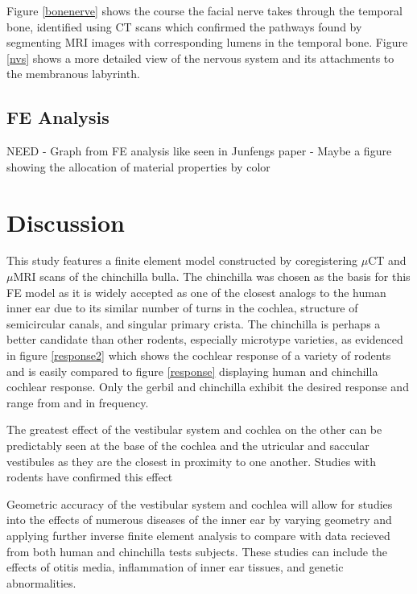 \documentclass[12pt]{article}
\begin{document}
Figure \ref{bonenerve} shows the course the facial nerve takes through the temporal bone, identified using CT scans which confirmed the pathways found by segmenting MRI images with corresponding lumens in the temporal bone. Figure \ref{nvs} shows a more detailed view of the nervous system and its attachments to the membranous labyrinth.


\subsection{FE Analysis}
NEED \newline - Graph from FE analysis like seen in Junfengs paper
- Maybe a figure showing the allocation of material properties by color



\section{Discussion}\label{discussion}
This study features a finite element model constructed by coregistering $\mu$CT and $\mu$MRI scans of the chinchilla bulla. The chinchilla was chosen as the basis for this FE model as it is widely accepted as one of the closest analogs to the human inner ear due to its similar number of turns in the cochlea, structure of semicircular canals, and singular primary crista. \cite{trevino:chinchmodel} The chinchilla is perhaps a better candidate than other rodents, especially microtype varieties, as evidenced in figure \ref{response2} which shows the cochlear response of a variety of rodents and is easily compared to figure \ref{response} displaying human and chinchilla cochlear response. Only the gerbil and chinchilla exhibit the desired response and range from and in frequency. \cite{mason}

   The greatest effect of the vestibular system and cochlea on the other can be predictably seen at the base of the cochlea and the utricular and saccular vestibules as they are the closest in proximity to one another.  Studies with rodents have confirmed this effect \cite{mizrachi}

Geometric accuracy of the vestibular system and cochlea will allow for studies into the effects of numerous diseases of the inner ear by varying geometry and applying further inverse finite element analysis to compare with data recieved from both human and chinchilla tests subjects. These studies can include the effects of otitis media, inflammation of inner ear tissues, and genetic abnormalities.
\end{document}
